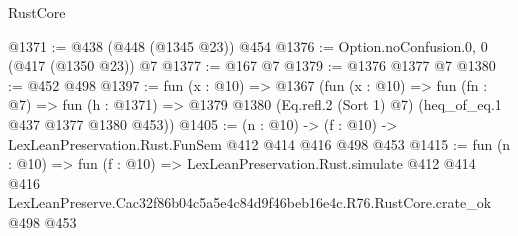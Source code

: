 \begin{lexlean}{RustCore}
\begin{coremodule}
@1371 := @438 (@448 (@1345 @23)) @454
@1376 := Option.noConfusion.{0, 0} (@417 (@1350 @23)) @7
@1377 := @167 @7
@1379 := @1376 @1377 @7
@1380 := @452 @498
@1397 := fun (x : @10) =>
  @1367
    (fun (x : @10) =>
    fun (fn : @7) =>
    fun (h : @1371) => @1379 @1380 (Eq.refl.{2} (Sort 1) @7) (heq_of_eq.{1} @437 @1377 @1380 @453))
@1405 := (n : @10) -> (f : @10) -> LexLeanPreservation.Rust.FunSem @412 @414 @416 @498 @453
@1415 := fun (n : @10) =>
  fun (f : @10) =>
  LexLeanPreservation.Rust.simulate
    @412
    @414
    @416
    LexLeanPreserve.Cac32f86b04c5a5e4c84d9f46beb16e4c.R76.RustCore.crate_ok
    @498
    @453
\end{coremodule}
\end{lexlean}
